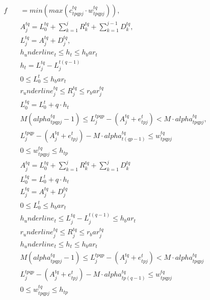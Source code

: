\begin{align}
  f\quad & = min \left(max \left(c_{tp qp j}^{\mathit{tq}} \cdot w_{tp qp j}^{\mathit{tq}}\right)\right) , \tag{eq\_0001} \\
  & A_{j}^{\mathit{tq}} = L_{0}^{\mathit{tq}} + \sum_{k = 1}^{j} R_{k}^{\mathit{tq}} + \sum_{k = 1}^{j - 1} D_{k}^{\mathit{tq}} , \tag{eq\_0002} \\
  & L_{j}^{\mathit{tq}} = A_{j}^{\mathit{tq}} + D_{j}^{\mathit{tq}} , \tag{eq\_0003} \\
  & h_underline_{t} \leq h_{t} \leq h_bar_{t} \tag{eq\_0004} \\
  & h_{t} = L_{j}^{\mathit{tq}} - L_{j}^{t \left(q - 1\right)} \tag{eq\_0005} \\
  & 0 \leq L_{0}^{t} \leq h_bar_{t} \tag{eq\_0006} \\
  & r_underline_{j}^{\mathit{tq}} \leq R_{j}^{\mathit{tq}} \leq r_bar_{j}^{\mathit{tq}} \tag{eq\_0007} \\
  & L_{0}^{\mathit{tq}} = L_{0}^{t} + q \cdot h_{t} \tag{eq\_0008} \\
  & M \left(\mathit{alpha}_{tp qp j}^{\mathit{tq}} - 1\right) \leq L_{j}^{tp qp} - \left(A_{j}^{\mathit{tq}} + e_{tp j}^{t}\right) < M \cdot \mathit{alpha}_{tp qp j}^{\mathit{tq}} , \tag{eq\_0009} \\
  & L_{j}^{tp qp} - \left(A_{j}^{\mathit{tq}} + e_{tp j}^{t}\right) - M \cdot \mathit{alpha}_{t \left(qp - 1\right)}^{\mathit{tq}} \leq w_{tp qp j}^{\mathit{tq}} \tag{eq\_0010} \\
  & 0 \leq w_{tp qp j}^{\mathit{tq}} \leq h_{tp} \tag{eq\_0011} \\
  & A_{j}^{\mathit{tq}} = L_{0}^{\mathit{tq}} + \sum_{k = 1}^{j} R_{k}^{\mathit{tq}} + \sum_{k = 1}^{j} D_{k}^{\mathit{tq}} \tag{eq\_0013\_a} \\
  & L_{0}^{\mathit{tq}} = L_{0}^{t} + q \cdot h_{t} \tag{eq\_0013\_b} \\
  & L_{j}^{\mathit{tq}} = A_{j}^{\mathit{tq}} + D_{j}^{\mathit{tq}} \tag{eq\_0013\_c} \\
  & 0 \leq L_{0}^{t} \leq h_bar_{t} \tag{eq\_0013\_d} \\
  & h_underline_{t} \leq L_{j}^{\mathit{tq}} - L_{j}^{t \left(q - 1\right)} \leq h_bar_{t} \tag{eq\_0013\_e} \\
  & r_underline_{j}^{\mathit{tq}} \leq R_{j}^{\mathit{tq}} \leq r_bar_{j}^{\mathit{tq}} \tag{eq\_0013\_f} \\
  & h_underline_{t} \leq h_{t} \leq h_bar_{t} \tag{eq\_0013\_g} \\
  & M \left(\mathit{alpha}_{tp qp j}^{\mathit{tq}} - 1\right) \leq L_{j}^{tp qp} - \left(A_{j}^{\mathit{tq}} + e_{tp j}^{t}\right) < M \cdot \mathit{alpha}_{tp qp j}^{\mathit{tq}} \tag{eq\_0013\_h} \\
  & L_{j}^{tp qp} - \left(A_{j}^{\mathit{tq}} + e_{tp j}^{t}\right) - M \cdot \mathit{alpha}_{tp \left(q - 1\right)}^{\mathit{tq}} \leq w_{tp qp j}^{\mathit{tq}} \tag{eq\_0013\_i} \\
  & 0 \leq w_{tp qp j}^{\mathit{tq}} \leq h_{tp} \tag{eq\_0013\_j} \\
\end{align}
